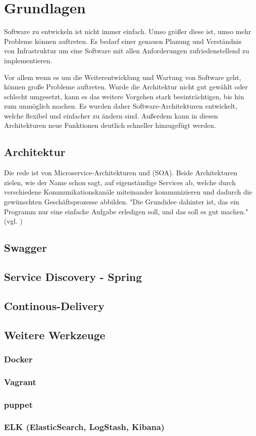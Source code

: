 \chapter{Grundlagen}
\label{chap:grundlagen}
Software zu entwickeln ist nicht immer einfach. Umso größer diese ist, umso mehr Probleme können auftreten. Es bedarf einer genauen Planung und Verständnis von Infrastruktur um eine Software mit allen Anforderungen zufriedenstellend zu implementieren. 

Vor allem wenn es um die Weiterentwicklung und Wartung von Software geht, können große Probleme auftreten. Wurde die Architektur nicht gut gewählt oder schlecht umgesetzt, kann es das weitere Vorgehen stark beeinträchtigen, bis hin zum unmöglich machen. Es wurden daher Software-Architekturen entwickelt, welche flexibel und einfacher zu ändern sind. Außerdem kann in diesen Architekturen neue Funktionen deutlich schneller hinzugefügt werden.

\section{Architektur}
\label{sec:architektur}
Die rede ist von Microservice-Architekturen und \SOA (SOA). Beide Architekturen zielen, wie der Name schon sagt, auf eigenständige Services ab, welche durch verschiedene Kommunikationskanäle miteinander kommunizieren und dadurch die gewünschten Geschäftsprozesse abbilden. "Die Grundidee dahinter ist, das ein Programm nur eine einfache Aufgabe erledigen soll, und das soll es gut machen." (vgl. \cite[S. 2]{EWolff2015})

\section{Swagger}

\section{Service Discovery - Spring}

\section{Continous-Delivery}

\section{Weitere Werkzeuge}

\subsection{Docker}

\subsection{Vagrant}

\subsection{puppet}

\subsection{ELK (ElasticSearch, LogStash, Kibana)}


